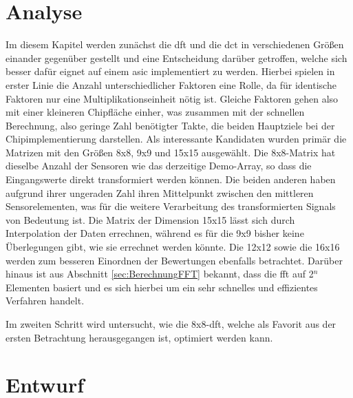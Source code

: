 \chapter{Analyse}
Im diesem Kapitel werden zunächst die \gls{dft} und die \gls{dct} in verschiedenen Größen einander gegenüber gestellt und eine Entscheidung darüber getroffen, welche
sich besser dafür eignet auf einem \gls{asic} implementiert zu werden. Hierbei spielen in erster Linie die Anzahl unterschiedlicher Faktoren eine Rolle, 
da für identische Faktoren nur eine Multiplikationseinheit nötig ist. Gleiche Faktoren gehen also mit einer kleineren Chipfläche einher, was zusammen mit der schnellen 
Berechnung, also geringe Zahl benötigter Takte, die beiden Hauptziele bei der Chipimplementierung darstellen.
Als interessante Kandidaten wurden primär die Matrizen mit den Größen 8x8, 9x9 und 15x15 ausgewählt. 
Die 8x8-Matrix hat dieselbe Anzahl der Sensoren wie das derzeitige Demo-Array, so dass die Eingangswerte
direkt transformiert werden können. 
Die beiden anderen haben aufgrund ihrer ungeraden Zahl ihren Mittelpunkt zwischen den mittleren Sensorelementen, was für die 
weitere Verarbeitung des transformierten Signals von Bedeutung ist. Die Matrix der Dimension 15x15 lässt sich durch Interpolation der Daten errechnen, während es für
die 9x9 bisher keine Überlegungen gibt, wie sie errechnet werden könnte.
Die 12x12 sowie die 16x16 werden zum besseren Einordnen der Bewertungen ebenfalls betrachtet.
Darüber hinaus ist aus Abschnitt \ref{sec:BerechnungFFT} bekannt, dass die \gls{fft} auf 2$^n$ Elementen basiert und es sich hierbei um ein sehr schnelles und 
effizientes Verfahren handelt. 

Im zweiten Schritt wird untersucht, wie die 8x8-\gls{dft}, welche als Favorit aus der ersten Betrachtung herausgegangen ist, optimiert werden kann.


 
 
 
 

 
 
 
\chapter{Entwurf}

 

 
 
 
 
  
 
